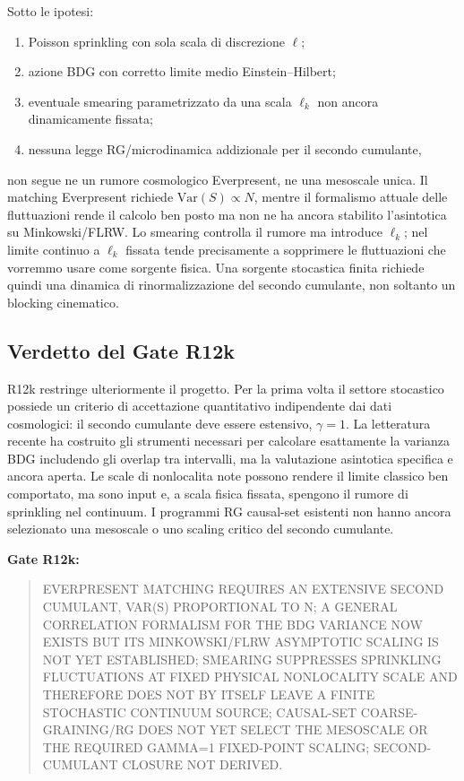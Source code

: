 \documentclass[11pt,a4paper]{article}
\begin{document}
Sotto le ipotesi:
\begin{enumerate}[label=(\roman*)]
 \item Poisson sprinkling con sola scala di discrezione $\ell$;
 \item azione BDG con corretto limite medio Einstein--Hilbert;
 \item eventuale smearing parametrizzato da una scala $\ell_k$ non ancora dinamicamente fissata;
 \item nessuna legge RG/microdinamica addizionale per il secondo cumulante,
\end{enumerate}
non segue ne un rumore cosmologico Everpresent, ne una mesoscale unica. Il matching Everpresent richiede $\mathrm{Var}(S)\propto N$, mentre il formalismo attuale delle fluttuazioni rende il calcolo ben posto ma non ne ha ancora stabilito l'asintotica su Minkowski/FLRW. Lo smearing controlla il rumore ma introduce $\ell_k$; nel limite continuo a $\ell_k$ fissata tende precisamente a sopprimere le fluttuazioni che vorremmo usare come sorgente fisica. Una sorgente stocastica finita richiede quindi una dinamica di rinormalizzazione del secondo cumulante, non soltanto un blocking cinematico.

\subsection{Verdetto del Gate R12k}

R12k restringe ulteriormente il progetto. Per la prima volta il settore stocastico possiede un criterio di accettazione quantitativo indipendente dai dati cosmologici: il secondo cumulante deve essere estensivo, $\gamma=1$. La letteratura recente ha costruito gli strumenti necessari per calcolare esattamente la varianza BDG includendo gli overlap tra intervalli, ma la valutazione asintotica specifica e ancora aperta. Le scale di nonlocalita note possono rendere il limite classico ben comportato, ma sono input e, a scala fisica fissata, spengono il rumore di sprinkling nel continuum. I programmi RG causal-set esistenti non hanno ancora selezionato una mesoscale o uno scaling critico del secondo cumulante.

\textbf{Gate R12k:}
\begin{quote}\small\textsf{EVERPRESENT MATCHING REQUIRES AN EXTENSIVE SECOND CUMULANT, VAR(S) PROPORTIONAL TO N; A GENERAL CORRELATION FORMALISM FOR THE BDG VARIANCE NOW EXISTS BUT ITS MINKOWSKI/FLRW ASYMPTOTIC SCALING IS NOT YET ESTABLISHED; SMEARING SUPPRESSES SPRINKLING FLUCTUATIONS AT FIXED PHYSICAL NONLOCALITY SCALE AND THEREFORE DOES NOT BY ITSELF LEAVE A FINITE STOCHASTIC CONTINUUM SOURCE; CAUSAL-SET COARSE-GRAINING/RG DOES NOT YET SELECT THE MESOSCALE OR THE REQUIRED GAMMA=1 FIXED-POINT SCALING; SECOND-CUMULANT CLOSURE NOT DERIVED}.\end{quote}
\end{document}
